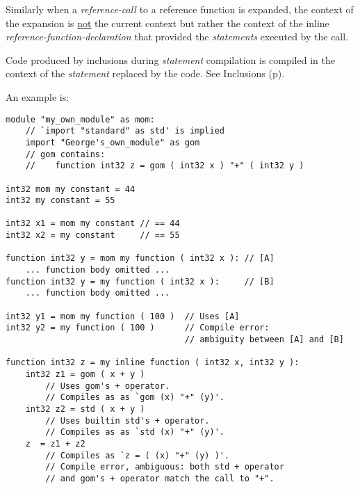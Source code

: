 \documentclass[12pt]{article}
\newcommand{\pagref}[1]{p\pageref{#1}}
\newenvironment{indpar}[1][0.3in]%
	{\begin{list}{}%
		     {\setlength{\itemsep}{0in}%
		      \setlength{\topsep}{0in}%
		      \setlength{\parsep}{1ex}%
		      \setlength{\labelwidth}{#1}%
		      \setlength{\leftmargin}{#1}%
		      \addtolength{\leftmargin}{\labelsep}}%
	 \item}%
	{\end{list}}
\begin{document}
Similarly when a {\em reference-call} to a reference function is expanded,
the context of the expansion is \underline{not} the current context but
rather the context of the inline {\em reference-function-declaration}
that provided the {\em statements} executed by the call.

Code produced by inclusions during {\em statement} compilation
is compiled in the context of the {\em statement} replaced by the
code.  See Inclusions (\pagref{INCLUSIONS}).

An example is:
\begin{indpar}\begin{verbatim}
module "my_own_module" as mom:
    // `import "standard" as std' is implied
    import "George's_own_module" as gom
    // gom contains:
    //    function int32 z = gom ( int32 x ) "+" ( int32 y )

int32 mom my constant = 44
int32 my constant = 55

int32 x1 = mom my constant // == 44
int32 x2 = my constant     // == 55

function int32 y = mom my function ( int32 x ): // [A]
    ... function body omitted ...
function int32 y = my function ( int32 x ):     // [B]
    ... function body omitted ...

int32 y1 = mom my function ( 100 )  // Uses [A]
int32 y2 = my function ( 100 )      // Compile error:
                                    // ambiguity between [A] and [B]

function int32 z = my inline function ( int32 x, int32 y ):
    int32 z1 = gom ( x + y )
        // Uses gom's + operator.
        // Compiles as as `gom (x) "+" (y)'.
    int32 z2 = std ( x + y )
        // Uses builtin std's + operator.
        // Compiles as as `std (x) "+" (y)'.
    z  = z1 + z2
        // Compiles as `z = ( (x) "+" (y) )'.
        // Compile error, ambiguous: both std + operator
        // and gom's + operator match the call to "+".
\end{verbatim}\end{indpar}\label{EXTERNAL-INTERNAL-EXAMPLE}
\end{document}
